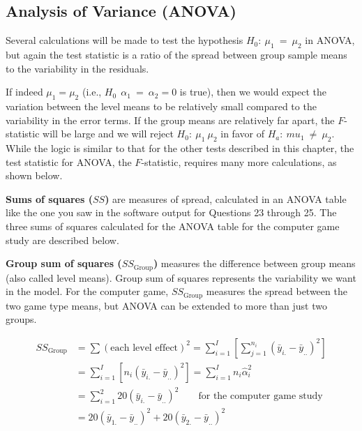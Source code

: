 \documentclass[
]{report}
\begin{document}
\hypertarget{analysis-of-variance-anova}{%
\subsection*{Analysis of Variance (ANOVA)}\label{analysis-of-variance-anova}}

Several calculations will be made to test the hypothesis \(\scriptstyle H_0:\  \mu_1 \ =\  \mu_2\) in ANOVA, but again the test statistic is a ratio of the spread between group sample means to the variability in the residuals.

If indeed \(\scriptstyle \mu_1 = \mu_2\) (i.e., \(\scriptstyle H_0\:\  \alpha_1 \ =\  \alpha_2 = 0\) is true), then we would expect the variation between the level means to be relatively small compared to the variability in the error terms. If the group means are relatively far apart, the \(\scriptstyle F\)-statistic will be large and we will reject \(\scriptstyle H_0:\  \mu_1 \  \mu_2\) in favor of \(\scriptstyle H_a:\ mu_1 \ \ne \ \mu_2\). While the logic is similar to that for the other tests described in this chapter, the test statistic for ANOVA, the \(\scriptstyle F\)-statistic, requires many more calculations, as shown below.

\textbf{Sums of squares (\(\scriptstyle SS\))} are measures of spread, calculated in an ANOVA table like the one you saw in the software output for Questions 23 through 25. The three sums of squares calculated for the ANOVA table for the computer game study are described below.

\textbf{Group sum of squares (\(\scriptstyle SS_{\text{Group}}\))} measures the difference between group means (also called level means). Group sum of squares represents the variability we want in the model. For the computer game, \(SS_{\text{Group}}\) measures the spread between the two game type means, but ANOVA can be extended to more than just two groups.

\begin{equation}
\label{2_10}
\begin{split}
SS_{\text{Group}} & = \sum (\text{each level effect})^2 
    = \sum_{i=1}^{I} \left[ \sum_{j=1}^{n_i} (\bar{y}_{i.} - \bar{y}_{..})^2 \right]\\
    & = \sum_{i=1}^{I} \left[ n_i (\bar{y}_{i.} - \bar{y}_{..})^2 \right] 
    = \sum_{i=1}^{I} n_i \hat{\alpha}_i^2 \\
    &  = \sum_{i=1}^{2} 20 (\bar{y}_{i.} - \bar{y}_{..})^2 
                  \qquad \text{for the computer game study} \\
    & = 20 (\bar{y}_{1.} - \bar{y}_{..})^2 + 20 (\bar{y}_{2.} - \bar{y}_{..})^2
\end{split}
\tag{2.10}
\end{equation}
\end{document}

